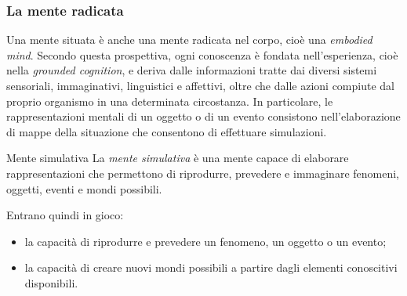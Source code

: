 \documentclass[a4paper]{article}
\begin{document}
\subsubsection{La mente radicata}
Una mente situata è anche una mente radicata nel corpo, cioè una \emph{embodied mind}. Secondo questa prospettiva, ogni conoscenza è fondata nell'esperienza, cioè nella \emph{grounded cognition}, e deriva dalle informazioni tratte dai diversi sistemi sensoriali, immaginativi, linguistici e affettivi, oltre che dalle azioni compiute dal proprio organismo in una determinata circostanza.
In particolare, le rappresentazioni mentali di un oggetto o di un evento consistono nell'elaborazione di mappe della situazione che consentono di effettuare simulazioni.
\begin{snippetdefinition}{Mente simulativa}
    La \emph{mente simulativa} è una mente capace di elaborare rappresentazioni che permettono di riprodurre, prevedere e immaginare fenomeni, oggetti, eventi e mondi possibili.
\end{snippetdefinition}
Entrano quindi in gioco:
\begin{itemize}
    \item la capacità di riprodurre e prevedere un fenomeno, un oggetto o un evento;
    \item la capacità di creare nuovi mondi possibili a partire dagli elementi conoscitivi disponibili.
\end{itemize}
\end{document}
